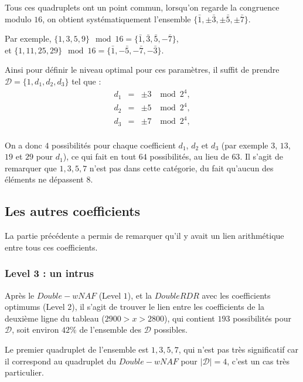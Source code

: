 \documentclass[12pt, a4paper]{memoir}
\begin{document}
  Tous ces quadruplets ont un point commun, lorsqu'on regarde la congruence modulo $16$, on obtient systématiquement
  l'ensemble $\{\bar{1},\pm\bar{3},\pm\bar{5},\pm\bar{7}\}$.
  
  Par exemple, $\{1,3,5,9\} \mod 16 = \{\bar{1},\bar{3},\bar{5},-\bar{7}\}$, \\
  et $\{1,11,25,29\} \mod 16 = \{\bar{1},-\bar{5},-\bar{7},-\bar{3}\}$.
  
  Ainsi pour définir le niveau optimal pour ces paramètres, il suffit de prendre 
  $\mathcal{D} = \{1,d_1,d_2,d_3\}$ tel que : \\
 $$\begin{array}{ccc}
d_1 & = & \pm 3 \,\, \mod 2^4, \\ 
d_2 & = & \pm 5 \,\, \mod 2^4, \\
d_3 & = & \pm 7 \,\, \mod 2^4, \\
   \end{array}$$
  
  On a donc $4$ possibilités pour chaque coefficient $d_1$, $d_2$ et $d_3$ (par exemple 
  $3$, $13$, $19$ et $29$ pour $d_1$), ce qui fait en tout $64$ possibilités, au lieu de $63$.
  Il s'agit de remarquer que $1,3,5,7$ n'est pas dans cette catégorie, du fait qu'aucun des éléments 
  ne dépassent $8$.
  
  \subsection{Les autres coefficients}
  
  La partie précédente a permis de remarquer qu'il y avait un lien arithmétique entre tous ces coefficients.
  
  \subsubsection{Level 3 : un intrus}
  
  Après le $Double-wNAF$ (Level $1$), et la $DoubleRDR$ avec les coefficients optimums (Level $2$), il s'agit de 
  trouver le lien entre les coefficients de la deuxième ligne du tableau ($2900 > x > 2800$), qui contient
  $193$ possibilités pour $\mathcal{D}$, soit environ $42 \%$ de l'ensemble des $\mathcal{D}$ possibles.
  
  Le premier quadruplet de l'ensemble est $1,3,5,7$, qui n'est pas très significatif car il correspond au 
  quadruplet du $Double-wNAF$ pour $|\mathcal{D}| = 4$, c'est un cas très particulier.
  
\end{document}

